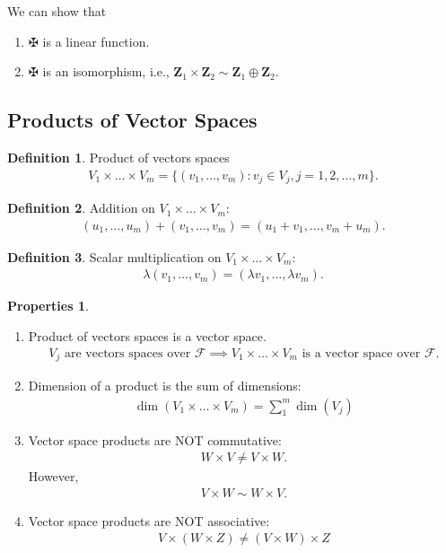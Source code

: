 \documentclass{article}
\theoremstyle{definition}
\newtheorem{defn}{Definition}[section]
\newtheorem{prop}{Properties}[section]
\newcommand{\F}{\mathcal{F}}
\newcommand{\Z}{\mathbf{Z}}
\begin{document}
We can show that
\begin{enumerate}
	\item $\maltese$ is a linear function. 
	
	\item $\maltese$ is an isomorphism, i.e., $\Z_1 \times \Z_2 \sim \Z_1 \oplus \Z_2$.
\end{enumerate}






\subsection{Products of Vector Spaces}




\begin{defn}
	Product of vectors spaces
	\begin{align*}
	V_1 \times\dots\times V_m = \{ (v_1,\dots,v_m): v_j \in V_j, j=1,2,\dots,m\}.
	\end{align*}
\end{defn}
\begin{defn}
	Addition on $V_1 \times\dots\times V_m$:
	\begin{align*}
	(u_1,\dots,u_m) + (v_1,\dots,v_m) = (u_1+v_1,\dots,v_m+u_m).
	\end{align*}
\end{defn}
\begin{defn}
	Scalar multiplication on $V_1 \times\dots\times V_m$:
	\begin{align*}
	\lambda(v_1,\dots,v_m) = (\lambda v_1,\dots,\lambda v_m).
	\end{align*}
\end{defn}
\begin{prop}
	$\,$
	\begin{enumerate}
		\item Product of vectors spaces is a vector space.
		\begin{align*}
		V_j \text{ are vectors spaces over } \F \implies V_1\times\dots\times V_m \text{ is a vector space over } \F.
		\end{align*}
		\item Dimension of a product is the sum of dimensions: 
		\begin{align*}
		\dim(V_1\times\dots\times V_m) = \sum_1^m\dim(V_j)
		\end{align*}
		\item Vector space products are NOT commutative:
		\begin{align*}
		W\times V \neq V\times W.
		\end{align*}
		However, 
		\begin{align*}
		V\times W \sim W \times V.
		\end{align*}
		\item Vector space products are NOT associative:
		\begin{align*}
		V\times(W\times Z) \neq (V\times W)\times Z
		\end{align*}
	\end{enumerate}
\end{prop}
\end{document}
